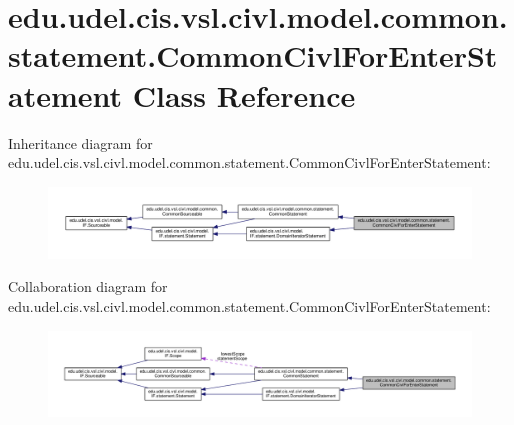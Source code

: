 \hypertarget{classedu_1_1udel_1_1cis_1_1vsl_1_1civl_1_1model_1_1common_1_1statement_1_1CommonCivlForEnterStatement}{}\section{edu.\+udel.\+cis.\+vsl.\+civl.\+model.\+common.\+statement.\+Common\+Civl\+For\+Enter\+Statement Class Reference}
\label{classedu_1_1udel_1_1cis_1_1vsl_1_1civl_1_1model_1_1common_1_1statement_1_1CommonCivlForEnterStatement}


Inheritance diagram for edu.\+udel.\+cis.\+vsl.\+civl.\+model.\+common.\+statement.\+Common\+Civl\+For\+Enter\+Statement\+:
\nopagebreak
\begin{figure}[H]
\begin{center}
\leavevmode
\includegraphics[width=350pt]{classedu_1_1udel_1_1cis_1_1vsl_1_1civl_1_1model_1_1common_1_1statement_1_1CommonCivlForEnterStatement__inherit__graph}
\end{center}
\end{figure}


Collaboration diagram for edu.\+udel.\+cis.\+vsl.\+civl.\+model.\+common.\+statement.\+Common\+Civl\+For\+Enter\+Statement\+:
\nopagebreak
\begin{figure}[H]
\begin{center}
\leavevmode
\includegraphics[width=350pt]{classedu_1_1udel_1_1cis_1_1vsl_1_1civl_1_1model_1_1common_1_1statement_1_1CommonCivlForEnterStatement__coll__graph}
\end{center}
\end{figure}

